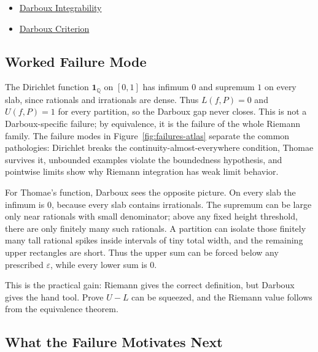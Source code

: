 \begin{dependencies}
\begin{itemize}
  \item \hyperref[def:darboux-integrability]{Darboux Integrability}
  \item \hyperref[thm:darboux-criterion]{Darboux Criterion}
\end{itemize}
\end{dependencies}

\subsection*{Worked Failure Mode}

\begin{remark*}[Interpretation]
The Dirichlet function \(\mathbf 1_{\mathbb Q}\) on \([0,1]\) has infimum
\(0\) and supremum \(1\) on every slab, since rationals and irrationals are
dense. Thus \(L(f,P)=0\) and \(U(f,P)=1\) for every partition, so the Darboux
gap never closes. This is not a Darboux-specific failure; by equivalence, it
is the failure of the whole Riemann family. The failure modes in
Figure~\ref{fig:failures-atlas} separate the common pathologies: Dirichlet
breaks the continuity-almost-everywhere condition, Thomae survives it,
unbounded examples violate the boundedness hypothesis, and pointwise limits
show why Riemann integration has weak limit behavior.
\end{remark*}



\begin{remark*}[Interpretation]
For Thomae's function, Darboux sees the opposite picture. On every slab the
infimum is \(0\), because every slab contains irrationals. The supremum can be
large only near rationals with small denominator; above any fixed height
threshold, there are only finitely many such rationals. A partition can isolate
those finitely many tall rational spikes inside intervals of tiny total width,
and the remaining upper rectangles are short. Thus the upper sum can be forced
below any prescribed \(\varepsilon\), while every lower sum is \(0\).

This is the practical gain: Riemann gives the correct definition, but Darboux
gives the hand tool. Prove \(U-L\) can be squeezed, and the Riemann value
follows from the equivalence theorem.
\end{remark*}

\subsection*{What the Failure Motivates Next}

